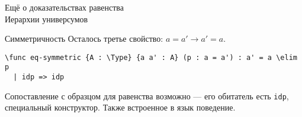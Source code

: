 \documentclass[aspectratio=169,dvipsnames,usenames]{beamer}
\begin{document}
\newtheorem{dfn}{Определение}[section]
\newtheorem{nte}{Замечание}[section]

\newtheorem{axiom}{Аксиома}[section]
\newtheorem{thm}{Теорема}[section]
\newtheorem{lmm}[theorem]{Лемма}
\newtheorem{statement}{Утверждение}[section]
\newtheorem{oun_paragraph}{Пункт}[section]
\newtheorem{cons}{Следствие}[section]
\newtheorem*{exm}{Пример}

\newcommand{\comb}[1]{\operatorname{\mathcal{#1}}}
\newcommand{\func}[1]{\operatorname{#1}}
\newcommand{\reduction}[1]{{\color{OrangeRed}#1}}
\newcommand{\set}[1]{\left\{#1\right\}}

\def\from#1{\par \parbox{0.7\textwidth}{\par \hfill\raggedleft \it #1}} 

\begin{frame}{}
\begin{center}
{\LARGE Ещё о доказательствах равенства\\Иерархии универсумов}
\end{center}
\end{frame}

\begin{frame}[fragile]{Симметричность}
Осталось третье свойство: $a = a' \rightarrow a' = a$.

\small\color[HTML]{025002}\begin{verbatim}
\func eq-symmetric {A : \Type} {a a' : A} (p : a = a') : a' = a \elim p
  | idp => idp
\end{verbatim}\normalsize
\color{black}

Сопоставление с образцом для равенства возможно --- 
его обитатель есть \verb!idp!, специальный конструктор. Также встроенное в язык поведение.


\end{frame}
\end{document}

